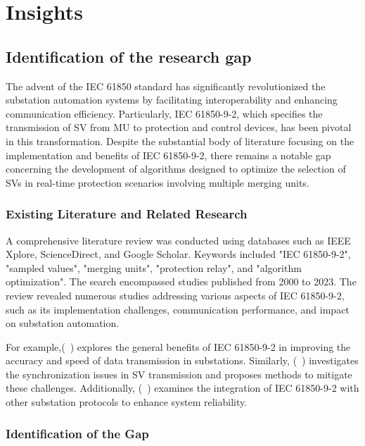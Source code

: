 \chapter{Insights} %

\section{Identification of the research gap}

The advent of the IEC 61850 standard has significantly revolutionized the substation automation systems by facilitating interoperability and enhancing communication efficiency. Particularly, IEC 61850-9-2, which specifies the transmission of SV from MU to protection and control devices, has been pivotal in this transformation. Despite the substantial body of literature focusing on the implementation and benefits of IEC 61850-9-2, there remains a notable gap concerning the development of algorithms designed to optimize the selection of SVs in real-time protection scenarios involving multiple merging units.

\subsection{Existing Literature and Related Research}

A comprehensive literature review was conducted using databases such as IEEE Xplore, ScienceDirect, and Google Scholar. Keywords included "IEC 61850-9-2", "sampled values", "merging units", "protection relay", and "algorithm optimization". The search encompassed studies published from 2000 to 2023. The review revealed numerous studies addressing various aspects of IEC 61850-9-2, such as its implementation challenges, communication performance, and impact on substation automation.

For example,(~\cite{AbbReport2010}) explores the general benefits of IEC 61850-9-2 in improving the accuracy and speed of data transmission in substations. Similarly, (~\cite{baumgartner2024iec}) investigates the synchronization issues in SV transmission and proposes methods to mitigate these challenges. Additionally, (~\cite{chen2016performance})  examines the integration of IEC 61850-9-2 with other substation protocols to enhance system reliability.

\subsection{Identification of the Gap}

